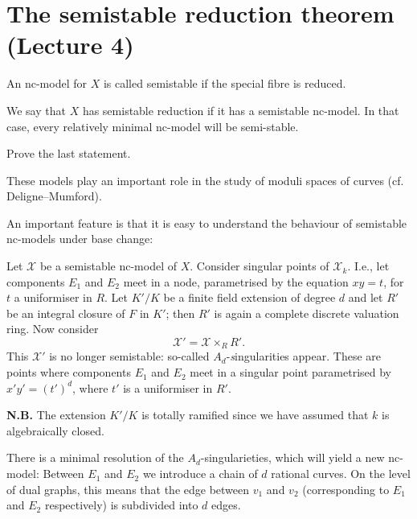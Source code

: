 \section{The semistable reduction theorem (Lecture 4)}

 An nc-model for $X$ is called semistable if the special fibre is reduced.

\begin{definition} We say that $X$ has semistable reduction if it has a semistable nc-model. In that case, every relatively minimal nc-model will be semi-stable. \end{definition}
\begin{exercise} Prove the last statement. \end{exercise}

\noindent These models play an important role in the study of moduli spaces of curves (cf. Deligne--Mumford).

\begin{remark} An important feature is that it is easy to understand the behaviour of semistable nc-models under base change:

Let $\mathcal{X}$ be a semistable nc-model of $X$. Consider singular points of $\mathcal{X}_k$. I.e., let components $E_1$ and $E_2$ meet in a node, parametrised by the equation $xy=t$, for $t$ a uniformiser in $R$. Let $K'/K$ be a finite field extension of degree $d$ and let $R'$ be an integral closure of $F$ in $K'$; then $R'$ is again a complete discrete valuation ring. Now consider
\[
\mathcal{X}' = \mathcal{X} \times_R R'.
\]
This $\mathcal{X}'$ is no longer semistable: so-called $A_d$-{\emph singularities} appear. These are points where components $E_1$ and $E_2$ meet in a singular point parametrised by $x'y' = (t')^d$, where $t'$ is a uniformiser in $R'$.

{\bfseries N.B.} The extension $K'/K$ is totally ramified since we have assumed that $k$ is algebraically closed.

There is a minimal resolution of the $A_d$-singularieties, which will yield a new nc-model: Between $E_1$ and $E_2$ we introduce a chain of $d$ rational curves. On the level of dual graphs, this means that the edge between $v_1$ and $v_2$ (corresponding to $E_1$ and $E_2$ respectively) is subdivided into $d$ edges.
\end{remark}

